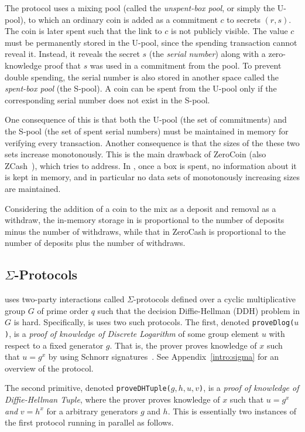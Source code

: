 \documentclass[runningheads]{llncs}
\begin{document}
The protocol uses a mixing pool (called the {\em unspent-box pool}, or simply the U-pool), to which an ordinary coin is added as a commitment $c$ to secrets $(r, s)$. The coin is later spent such that the link to $c$ is not publicly visible. The value $c$ must be permanently stored in the U-pool, since the spending transaction cannot reveal it. Instead, it reveals the secret $s$ (the {\em serial number}) along with a zero-knowledge proof that $s$ was used in a commitment from the pool. To prevent double spending, the serial number is also stored in another space called the {\em spent-box pool} (the S-pool). A coin can be spent from the U-pool only if the corresponding serial number does not exist in the S-pool. 

One consequence of this is that both the U-pool (the set of commitments) and the S-pool (the set of spent serial numbers) must be maintained in memory for verifying every transaction. 
Another consequence is that the sizes of the these two sets increase monotonously. 
This is the main drawback of ZeroCoin (also ZCash~\cite{zcash}), which \algname tries to address. 
In \algname, once a box is spent, no information about it is kept in memory, and in particular no data sets of monotonously increasing sizes are maintained. 

Considering the addition of a coin to the mix as a deposit and removal as a withdraw, the in-memory storage in \algname is proportional to the number of deposits minus the number of withdraws, while that in ZeroCash is proportional to the number of deposits plus the number of withdraws.  

\subsection{$\Sigma$-Protocols} 

\algname uses two-party interactions called $\Sigma$-protocols defined over a cyclic multiplicative group $G$ of prime order $q$ such that the decision Diffie-Hellman (DDH) problem in $G$ is hard. Specifically, is uses two such protocols. The first, denoted \texttt{proveDlog($u$)}, is a {\em proof of knowledge of Discrete Logarithm} of some group element $u$ with respect to a fixed generator $g$. That is, the prover proves knowledge of $x$ such that $u = g^x$ by using Schnorr signatures~\cite{Sch91}. See Appendix~\ref{intro:sigma} for an overview of the protocol. 

The second primitive, denoted \texttt{proveDHTuple($g, h, u, v$)}, is a {\em proof of knowledge of Diffie-Hellman Tuple}, where the prover proves knowledge of $x$ such that $u = g^x$ {\em and} $v = h^x$ for a arbitrary generators $g$ and $h$. This is essentially two instances of the first protocol running in parallel as follows.
\end{document}
